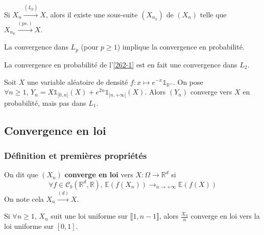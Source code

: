 
  \begin{proposition}
    Si $X_n \overset{(L_p)}{\longrightarrow} X$, alors il existe une sous-suite $(X_{n_k})$ de $(X_n)$ telle que $X_{n_k} \overset{(ps.)}{\longrightarrow} X$.
  \end{proposition}

  \begin{theorem}
    La convergence dans $L_p$ (pour $p \geq 1$) implique la convergence en probabilité.
  \end{theorem}

  \begin{example}
    La convergence en probabilité de l'\cref{262-1} est en fait une convergence dans $L_2$.
  \end{example}


  \begin{cexample}
    Soit $X$ une variable aléatoire de densité $f : x \mapsto e^{-x} \mathbb{1}_{\mathbb{R}^+}$. On pose $\forall n \geq 1, \, Y_n = X \mathbb{1}_{[0,n[}(X) + e^{2n} \mathbb{1}_{[n,+\infty[}(X)$. Alors $(Y_n)$ converge vers $X$ en probabilité, mais pas dans $L_1$.
  \end{cexample}

  \subsection{Convergence en loi}

  \subsubsection{Définition et premières propriétés}


  \begin{definition}
    On dit que $(X_n)$ \textbf{converge en loi} vers $X : \Omega \rightarrow \mathbb{R}^d$ si
    \[ \forall f \in \mathcal{C}_b(\mathbb{R}^d, \mathbb{R}), \, \mathbb{E}(f(X_n)) \longrightarrow_{n \rightarrow +\infty} \mathbb{E}(f(X)) \]
    On note cela $X_n \overset{(d)}{\longrightarrow} X$.
  \end{definition}


  \begin{example}
    Si $\forall n \geq 1$, $X_n$ suit une loi uniforme sur $\llbracket 1, n-1 \rrbracket$, alors $\frac{X_n}{n}$ converge en loi vers la loi uniforme sur $[0,1]$.
  \end{example}

